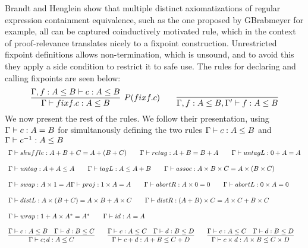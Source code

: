 \documentclass[a4paper,UKenglish,cleveref, autoref, thm-restate]{lipics-v2021}
\begin{document}
Brandt and Henglein show that multiple distinct axiomatizations of regular expression containment equivalence, such as the one proposed by GBrabmeyer for example, all can be captured coinductively motivated rule, which in the context of proof-relevance translates nicely to a fixpoint construction. Unrestricted fixpoint definitions allows non-termination, which is unsound, and to avoid this they apply a side condition to restrict it to safe use. The rules for declaring and calling fixpoints are seen below:
\begin{displaymath}
\infer[P(\fix f.c)]{ \containsG{\fix f.c}{A}{B}}{\contains{\Gamma,f : A \leq B}{c}{A}{B}} \qquad
 \infer{\contains{\Gamma ,f : A \leq B, \Gamma'}{ f}{A}{B}}{}
\end{displaymath}
We now present the rest of the rules. We follow their presentation, using $\myaxiomC{c}{A}{B}$ for simultanously defining the two rules  $\containsG{c}{A}{B}$ and  $\containsG{c^{-1}}{A}{B}$
\begin{displaymath}
\begin{array}{lll}
\myaxiomC{shuffle}{A + B + C}{A + (B + C)} \qquad  
\myaxiomC{retag}{A + B}{B + A} \qquad 
\myaxiomC{untagL}{0 + A}{A} 
\\\\
\containsG{untag}{A + A}{A}   \qquad \containsG{tagL}{A}{A + B} \qquad

\myaxiomC{assoc}{A \times B \times C}{A \times (B \times C)}
\\\\
\myaxiomC{swap}{A \times 1}{A} 
\myaxiomC{proj}{1 \times A}{A} \qquad
\myaxiomC{abortR}{A \times 0}{0} \qquad
\myaxiomC{abortL}{0 \times A}{0} 
\\\\
\myaxiomC{distL}{A \times (B + C)} {A \times B + A \times C} \qquad
\myaxiomC{distR}{(A + B)\times C}{A \times C + B \times C} 
\\\\
\myaxiomC{wrap}{1 + A \times A^*}{A^* } \qquad \myaxiomC{id}{A}{A}
\\\\
\infer{\containsG{c;d}{A}{C}}{\containsG{c}{A}{B} & \containsG{d}{B}{C}} \qquad

\infer{\containsG{c + d}{A + B}{ C + D}}{\containsG{c}{A}{C} & \containsG{d}{B}{D}}  \qquad

\infer{\containsG{c \times d}{A \times B}{ C \times D}}{\containsG{c}{A}{C} & \containsG{d}{B}{D}} 
\end{array}
\end{displaymath}
\end{document}
